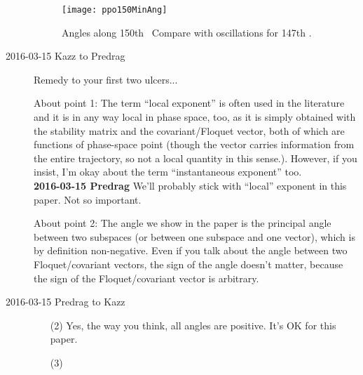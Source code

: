 \begin{description}
  \begin{figure}[h]
    \centering
    \texttt{[image: ppo150MinAng]}
    \caption{
    Angles along 150th \ppo\
    Compare with  oscillations
    for 147th \ppo.
    }
    \label{fig:ppo150}
  \end{figure}

\item[2016-03-15 Kazz to Predrag]
Remedy to your first two ulcers...

About point 1: The term ``local exponent'' is often used in the literature and it is in any way local in phase space, too, as it is simply obtained with the stability matrix and the covariant/Floquet vector, both of which are functions of phase-space point (though the vector carries information from the entire trajectory, so not a local quantity in this sense.). However, if you insist, I'm okay about the term ``instantaneous exponent'' too.
\\ {\bf 2016-03-15 Predrag} We'll probably stick with ``local'' exponent in this paper.
Not so important.

About point 2: The angle we show in the paper is the principal angle between two subspaces (or between one subspace and one vector), which is by definition non-negative. Even if you talk about the angle between two Floquet/covariant vectors, the sign of the angle doesn't matter, because the sign of the Floquet/covariant vector is arbitrary.


\item[2016-03-15 Predrag to Kazz]

\begin{enumerate}
  \item[(2)]
Yes, the way you think, all angles are positive. It's OK for this paper.
  \item[(3)]



\end{enumerate}
\end{description}
